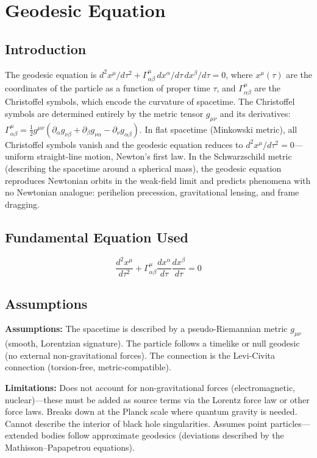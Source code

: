 \documentclass[11pt,openright]{book}
\begin{document}

\chapter{Geodesic Equation}

\section*{Introduction}

The geodesic equation is $d^2 x^\mu/d\tau^2 + \Gamma^\mu_{\alpha\beta}\,dx^\alpha/d\tau\,dx^\beta/d\tau = 0$, where $x^\mu(\tau)$ are the coordinates of the particle as a function of proper time $\tau$, and $\Gamma^\mu_{\alpha\beta}$ are the Christoffel symbols, which encode the curvature of spacetime. The Christoffel symbols are determined entirely by the metric tensor $g_{\mu\nu}$ and its derivatives: $\Gamma^\mu_{\alpha\beta} = \frac{1}{2}g^{\mu\nu}(\partial_\alpha g_{\nu\beta} + \partial_\beta g_{\nu\alpha} - \partial_\nu g_{\alpha\beta})$. In flat spacetime (Minkowski metric), all Christoffel symbols vanish and the geodesic equation reduces to $d^2 x^\mu/d\tau^2 = 0$---uniform straight-line motion, Newton's first law. In the Schwarzschild metric (describing the spacetime around a spherical mass), the geodesic equation reproduces Newtonian orbits in the weak-field limit and predicts phenomena with no Newtonian analogue: perihelion precession, gravitational lensing, and frame dragging.
\section*{Fundamental Equation Used}

\[
\frac{d^2 x^\mu}{d\tau^2}+\Gamma^\mu_{\alpha\beta}\frac{dx^\alpha}{d\tau}\frac{dx^\beta}{d\tau}=0
\]
\section*{Assumptions}

\textbf{Assumptions:} The spacetime is described by a pseudo-Riemannian metric $g_{\mu\nu}$ (smooth, Lorentzian signature). The particle follows a timelike or null geodesic (no external non-gravitational forces). The connection is the Levi-Civita connection (torsion-free, metric-compatible).


\textbf{Limitations:} Does not account for non-gravitational forces (electromagnetic, nuclear)---these must be added as source terms via the Lorentz force law or other force laws. Breaks down at the Planck scale where quantum gravity is needed. Cannot describe the interior of black hole singularities. Assumes point particles---extended bodies follow approximate geodesics (deviations described by the Mathisson--Papapetrou equations).
\end{document}
